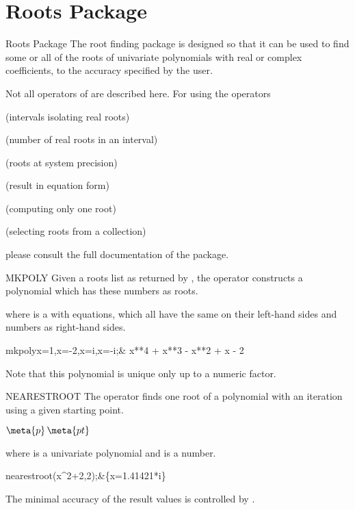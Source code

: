 \section{Roots Package}
\begin{Introduction}{Roots Package}
The root  finding package is designed  so that it can  
be  used to  find some  or  all of  the roots  of  univariate
polynomials  with  real or  complex  coefficients,  to  the  accuracy
specified by the user.                             

Not all operators of  are described here. For using
the operators 

 (intervals isolating real roots)

 (number of real roots in an interval)

 (roots at system precision)

 (result in equation form)

 (computing only one root)

 (selecting roots from a collection)

please consult the full documentation of the package.

\end{Introduction}

\begin{Operator}{MKPOLY}
Given a roots list as returned by ,
the operator  constructs a 
polynomial which has these numbers as roots.
\begin{Syntax}
 
\end{Syntax}
where  is a  with equations, which
all have the same  on their left-hand sides
and numbers as right-hand sides.

\begin{Examples}
mkpoly{x=1,x=-2,x=i,x=-i};&
x**4 + x**3 - x**2 + x - 2\\
\end{Examples}

Note that this polynomial is unique only up to a numeric
factor.
\end{Operator}


\begin{Operator}{NEARESTROOT}
The operator  finds one root of a polynomial
with an iteration using a given starting point.

\begin{Syntax}
\(\meta{p}\,\meta{pt}\)
\end{Syntax}

where  is a univariate polynomial
and  is a number. 

\begin{Examples}
nearestroot(x^2+2,2);&\{x=1.41421*i\}\\
\end{Examples}
The minimal accuracy of the result values is controlled by 
.
\end{Operator}

